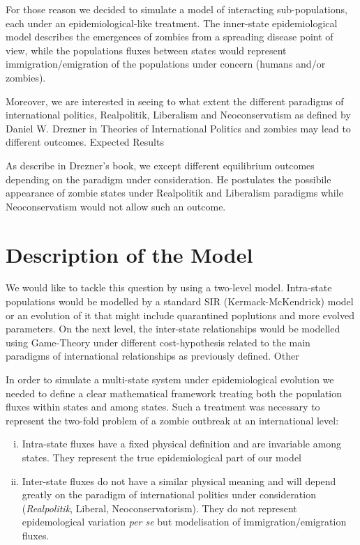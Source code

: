 \documentclass[11pt]{article} %
\begin{document}
For those reason we decided to simulate a model of interacting sub-populations, each under an epidemiological-like treatment. The inner-state epidemiological model describes the emergences of zombies from a spreading disease point of view, while the populations fluxes between states would represent immigration/emigration of the populations under concern (humans and/or zombies). 

Moreover, we are interested in seeing to what extent the different paradigms of international politics, Realpolitik, Liberalism and Neoconservatism as defined by Daniel W. Drezner in Theories of International Politics and zombies may lead to different outcomes.
Expected Results

As describe in Drezner's book, we except different equilibrium outcomes depending on the paradigm under consideration. He postulates the possibile appearance of zombie states under Realpolitik and Liberalism paradigms while Neoconservatism would not allow such an outcome.

\section{Description of the Model}\indent

We would like to tackle this question by using a two-level model. Intra-state populations would be modelled by a standard SIR (Kermack-McKendrick) model or an evolution of it that might include quarantined poplutions and more evolved parameters. On the next level, the inter-state relationships would be modelled using Game-Theory under different cost-hypothesis related to the main paradigms of international relationships as previously defined.
Other



In order to simulate a multi-state system under epidemiological evolution we needed to define a clear mathematical framework treating both the population fluxes within states and among states. Such a treatment was necessary to represent the two-fold problem of a zombie outbreak at an international level:
\begin{enumerate}[i.]
	\item Intra-state fluxes have a fixed physical definition and are invariable among states. They represent the true epidemiological part of our model
	\item Inter-state fluxes do not have a similar physical meaning and will depend greatly on the paradigm of international politics under consideration (\textit{Realpolitik}, Liberal, Neoconservatorism). They do not represent epidemological variation \textit{per se} but modelisation of immigration/emigration fluxes.
\end{enumerate}
\end{document}
